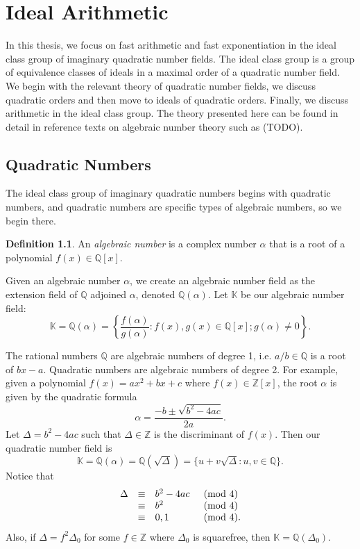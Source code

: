 \documentclass{ucalgthes1}
\theoremstyle{plain}
\theoremstyle{definition}
\newtheorem{defn}[thm]{Definition}
\newcommand{\KK}{\mathbb{K}}
\newcommand{\ZZ}{\mathbb{Z}}
\newcommand{\QQ}{\mathbb{Q}}
\begin{document}
\setcounter{chapter}{1}
\chapter{Ideal Arithmetic}

In this thesis, we focus on fast arithmetic and fast exponentiation in the ideal class group of imaginary quadratic number fields.  The ideal class group is a group of equivalence classes of ideals in a maximal order of a quadratic number field.   We begin with the relevant theory of quadratic number fields, we discuss quadratic orders and then move to ideals of quadratic orders.  Finally, we discuss arithmetic in the ideal class group.  The theory presented here can be found in detail in reference texts on algebraic number theory such as (TODO). 



\section{Quadratic Numbers}

The ideal class group of imaginary quadratic numbers begins with quadratic numbers, and quadratic numbers are specific types of algebraic numbers, so we begin there.   

\begin{defn}
An \emph{algebraic number} is a complex number $\alpha$ that is a root of a polynomial $f(x) \in \QQ[x]$.
\end{defn}

\noindent
Given an algebraic number $\alpha$, we create an algebraic number field as the extension field of $\QQ$ adjoined $\alpha$, denoted $\QQ(\alpha)$. Let $\KK$ be our algebraic number field:
\[
	\KK = \QQ(\alpha) = \left\{ \frac{f(\alpha)}{g(\alpha)} : f(x), g(x) \in \QQ[x]; g(\alpha) \ne 0 \right\}.
\]

\noindent
The rational numbers $\QQ$ are algebraic numbers of degree 1, i.e. $a/b \in \QQ$ is a root of $bx - a$.  Quadratic numbers are algebraic numbers of degree 2.  For example, given a polynomial $f(x) = ax^2 + bx + c$ where $f(x) \in \ZZ[x]$, the root $\alpha$ is given by the quadratic formula
\[
	\alpha = \frac{-b \pm \sqrt{b^2 - 4ac}}{2a}.
\]
Let $\Delta = b^2 -4ac$ such that $\Delta \in \ZZ$ is the discriminant of $f(x)$.  Then our quadratic number field is 
\[
	\KK = \QQ(\alpha) = \QQ(\sqrt{\Delta}) = \{u + v\sqrt{\Delta} : u,v \in \QQ\}.
\]
Notice that
\begin{eqnarray*}
\begin{array}{l l l l}
	\Delta & \equiv & b^2-4ac & \pmod 4 \\
	& \equiv & b^2 & \pmod 4 \\
	& \equiv & 0,1 & \pmod 4.
\end{array}
\end{eqnarray*}
Also, if $\Delta = f^2 \Delta_0$ for some $f \in \ZZ$ where $\Delta_0$ is squarefree, then $\KK = \QQ(\Delta_0)$.
\end{document}
